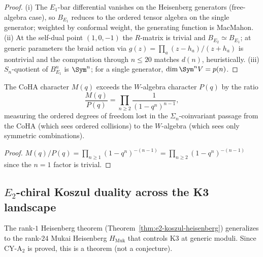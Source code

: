 \begin{proof}
(i) The $E_1$-bar differential vanishes on the Heisenberg generators
(free-algebra case), so $B_{E_1}$ reduces to the ordered tensor
algebra on the single generator; weighted by conformal weight, the
generating function is MacMahon. (ii) At the self-dual point
$(1,0,-1)$ the $R$-matrix is trivial and $B_{E_2} \simeq B_{E_1}$;
at generic parameters the braid action via $g(z) = \prod_a
(z-h_a)/(z+h_a)$ is nontrivial and the computation through \(n\leq20\)
matches \(d(n)\), heuristically.
(iii) $S_n$-quotient of $B_{E_1}^n$ is $\Sym^n$; for a single
generator, $\dim \Sym^n V = p(n)$.
\end{proof}

\begin{proposition}
\label{prop:coha-walg-ratio}
The CoHA character $M(q)$ exceeds the $W$-algebra character $P(q)$
by the ratio
\[
 \frac{M(q)}{P(q)} = \prod_{n \geq 2} \frac{1}{(1-q^n)^{n-1}},
\]
measuring the ordered degrees of freedom lost in the
$\Sigma_n$-coinvariant passage from the CoHA (which sees
ordered collisions) to the $W$-algebra (which sees only
symmetric combinations).
\end{proposition}

\begin{proof}
$M(q)/P(q) = \prod_{n \geq 1} (1-q^n)^{-(n-1)} = \prod_{n \geq 2}
(1-q^n)^{-(n-1)}$ since the $n=1$ factor is trivial.
\end{proof}


\subsection{\texorpdfstring{$E_2$}{E-2}-chiral Koszul duality across the K3 landscape}
\label{subsec:e2-koszul-k3-landscape}

The rank-$1$ Heisenberg theorem
(Theorem~\ref{thm:e2-koszul-heisenberg}) generalizes to the rank-$24$
Mukai Heisenberg $H_{\mathrm{Muk}}$ that controls K3 at generic moduli.
Since CY-A$_2$ is proved, this is a theorem (not a conjecture).

